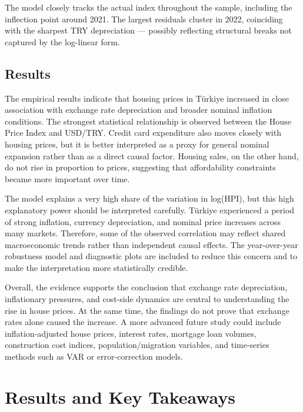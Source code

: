 \documentclass[
  11pt,
  a4paper,
]{article}
\begin{document}
The model closely tracks the actual index throughout the sample,
including the inflection point around 2021. The largest residuals
cluster in 2022, coinciding with the sharpest TRY depreciation ---
possibly reflecting structural breaks not captured by the log-linear
form.

\subsection{Results}\label{results}

The empirical results indicate that housing prices in Türkiye increased
in close association with exchange rate depreciation and broader nominal
inflation conditions. The strongest statistical relationship is observed
between the House Price Index and USD/TRY. Credit card expenditure also
moves closely with housing prices, but it is better interpreted as a
proxy for general nominal expansion rather than as a direct causal
factor. Housing sales, on the other hand, do not rise in proportion to
prices, suggesting that affordability constraints became more important
over time.

The model explains a very high share of the variation in log(HPI), but
this high explanatory power should be interpreted carefully. Türkiye
experienced a period of strong inflation, currency depreciation, and
nominal price increases across many markets. Therefore, some of the
observed correlation may reflect shared macroeconomic trends rather than
independent causal effects. The year-over-year robustness model and
diagnostic plots are included to reduce this concern and to make the
interpretation more statistically credible.

Overall, the evidence supports the conclusion that exchange rate
depreciation, inflationary pressures, and cost-side dynamics are central
to understanding the rise in house prices. At the same time, the
findings do not prove that exchange rates alone caused the increase. A
more advanced future study could include inflation-adjusted house
prices, interest rates, mortgage loan volumes, construction cost
indices, population/migration variables, and time-series methods such as
VAR or error-correction models.

\section{Results and Key Takeaways}\label{results-and-key-takeaways}
\end{document}
